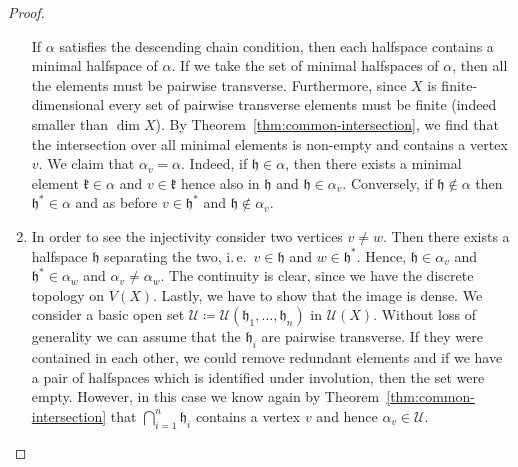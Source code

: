 \begin{proof}
\begin{enumerate}
    If \(\alpha\) satisfies the descending chain condition, then each halfspace contains a minimal halfspace of \(\alpha\). If we take the set of minimal halfspaces of \(\alpha\), then all the elements must be pairwise transverse. Furthermore, since \(X\) is finite-dimensional every set of pairwise transverse elements must be finite (indeed smaller than \(\dim X\)). By Theorem~\ref{thm:common-intersection}, we find that the intersection over all minimal elements is non-empty and contains a vertex \(v\). We claim that \(\alpha_v = \alpha\). Indeed, if \(\mathfrak{h} \in \alpha\), then there exists a minimal element \(\mathfrak{k} \in \alpha\) and \(v \in \mathfrak{k}\) hence also in \(\mathfrak{h}\) and \(\mathfrak{h} \in \alpha_v\). Conversely, if \(\mathfrak{h} \not \in \alpha\) then \(\mathfrak{h}^\ast \in \alpha\) and as before \(v \in \mathfrak{h}^\ast\) and \(\mathfrak{h} \not \in \alpha_v\).
  \item In order to see the injectivity consider two vertices \(v \neq w\). Then there exists a halfspace \(\mathfrak{h}\) separating the two, i.\,e.\ \(v \in \mathfrak{h}\) and \(w \in \mathfrak{h}^\ast\). Hence, \(\mathfrak{h} \in \alpha_v\) and \(\mathfrak{h}^\ast \in \alpha_w\) and \(\alpha_v \neq \alpha_w\). The continuity is clear, since we have the discrete topology on \(V(X)\). Lastly, we have to show that the image is dense. We consider a basic open set \(\mathcal{U} \coloneqq \mathcal{U}(\mathfrak{h}_1, \dots, \mathfrak{h}_n)\) in \(\mathcal{U}(X)\). Without loss of generality we can assume that the \(\mathfrak{h}_i\) are pairwise transverse. If they were contained in each other, we could remove redundant elements and if we have a pair of halfspaces which is identified under involution, then the set were empty. However, in this case we know again by Theorem~\ref{thm:common-intersection} that \(\bigcap_{i=1}^n \mathfrak{h}_i\) contains a vertex \(v\) and hence \(\alpha_v \in \mathcal{U}\).

\end{enumerate}
\end{proof}
